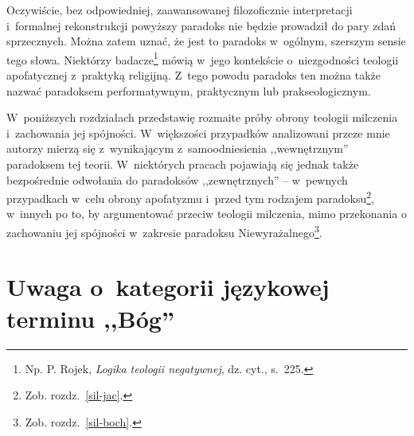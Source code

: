 Oczywiście, bez odpowiedniej, zaawansowanej filozoficznie interpretacji i~formalnej rekonstrukcji powyższy paradoks nie będzie prowadził do pary zdań sprzecznych. Można zatem uznać, że jest to paradoks w~ogólnym, szerszym sensie tego słowa. Niektórzy badacze\footnote{Np. P. Rojek, \textit{Logika teologii negatywnej}, dz. cyt., s.~225.} mówią w~jego kontekście o~niezgodności teologii apofatycznej z~praktyką religijną. Z~tego powodu paradoks ten można także nazwać paradoksem performatywnym, praktycznym lub prakseologicznym.

W~poniższych rozdziałach przedstawię rozmaite próby obrony teologii milczenia i~zachowania jej spójności. W~większości przypadków analizowani przeze mnie autorzy mierzą się z~wynikającym z~samoodniesienia ,,wewnętrznym'' paradoksem tej teorii. W~niektórych pracach pojawiają się jednak także bezpośrednie odwołania  do paradoksów ,,zewnętrznych'' -- w~pewnych przypadkach w~celu obrony apofatyzmu i~przed tym rodzajem paradoksu\footnote{Zob. rozdz.~\ref{sil-jac}.}, w~innych po to, by argumentować przeciw teologii milczenia, mimo przekonania o zachowaniu jej spójności w~zakresie paradoksu Niewyrażalnego\footnote{Zob. rozdz.~\ref{sil-boch}.}.


\section{Uwaga o~kategorii językowej terminu ,,Bóg''}\label{sil-kt-jez}

